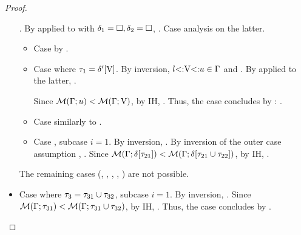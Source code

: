 \begin{proof}
\begin{itemize}
            .
            By  applied to
            with $\delta_1=\square,\delta_2=\square$,
            .
            Case analysis on the latter.
            \begin{itemize}
                \item Case  by .
                \item Case  where $\tau_1 = \delta'[\mathrm{V}]$.
                    By inversion, $l{\operatorname{<:}}\mathrm{V}{\operatorname{<:}}u \in \Gamma$ and
                    {}.
                    By  applied to the latter,
                    {\plug{}}.

                    Since $\operatorname{\mathcal{M}}(\Gamma;u) < \operatorname{\mathcal{M}}(\Gamma;\mathrm{V})$, by IH,
                    .
                    Thus, the case concludes by :
                    .
                \item Case  similarly to .
                \item Case , subcase $i=1$.
                    By inversion, .
                    By inversion of the outer case assumption
                    ,
                    .
                    Since $\operatorname{\mathcal{M}}(\Gamma;\delta[\tau_{21}]) < 
                    \operatorname{\mathcal{M}}(\Gamma;\delta[\tau_{21} \cup \tau_{22}])$,
                    by IH, .
            \end{itemize}
            The remaining cases
            (, , , , ) 
            are not possible.
        \item Case  
             where 
            $\tau_3 = \tau_{31} \cup \tau_{32}$, subcase $i=1$.
            By inversion, . Since
            $\operatorname{\mathcal{M}}(\Gamma;\tau_{31}) < \operatorname{\mathcal{M}}(\Gamma;\tau_{31} \cup \tau_{32})$,
            by IH, .
            Thus, the case concludes by .
    \end{itemize}
\end{proof}

